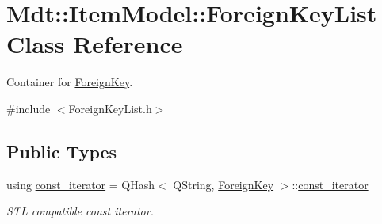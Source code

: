 \hypertarget{class_mdt_1_1_item_model_1_1_foreign_key_list}{}\section{Mdt\+:\+:Item\+Model\+:\+:Foreign\+Key\+List Class Reference}
\label{class_mdt_1_1_item_model_1_1_foreign_key_list}


Container for \hyperlink{class_mdt_1_1_item_model_1_1_foreign_key}{Foreign\+Key}.  




{\ttfamily \#include $<$Foreign\+Key\+List.\+h$>$}

\subsection*{Public Types}
\begin{DoxyCompactItemize}
\item 
using \hyperlink{class_mdt_1_1_item_model_1_1_foreign_key_list_a3c761b1204692763e403333043701b6a}{const\+\_\+iterator} = Q\+Hash$<$ Q\+String, \hyperlink{class_mdt_1_1_item_model_1_1_foreign_key}{Foreign\+Key} $>$\+::\hyperlink{class_mdt_1_1_item_model_1_1_foreign_key_list_a3c761b1204692763e403333043701b6a}{const\+\_\+iterator}
\begin{DoxyCompactList}\small\item\em S\+TL compatible const iterator. \end{DoxyCompactList}\end{DoxyCompactItemize}
